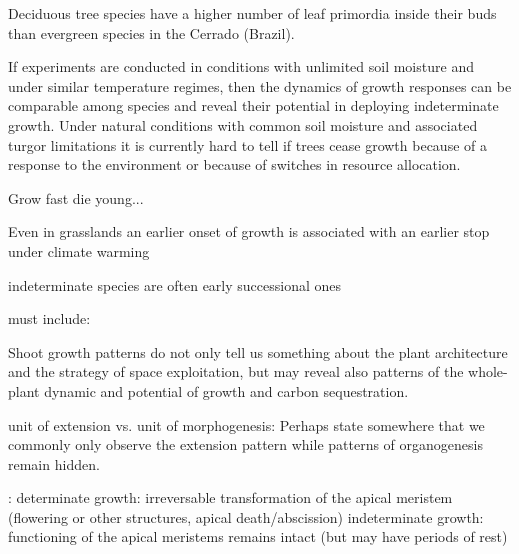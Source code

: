 \documentclass{article}
\begin{document}
Deciduous tree species have a higher number of leaf primordia inside their buds than evergreen species in the Cerrado (Brazil). 
	
If experiments are conducted in conditions with unlimited soil moisture and under similar temperature regimes, then the dynamics of growth responses can be comparable among species and reveal their potential in deploying indeterminate growth. Under natural conditions with common soil moisture and associated turgor limitations it is currently hard to tell if trees cease growth because of a response to the environment or because of switches in resource allocation. 

 Grow fast die young...
 
 Even in grasslands an earlier onset of growth is associated with an earlier stop under climate warming \cite{mohlGrowthAlpineGrassland2022a}
	
indeterminate species are often early successional ones \citep{marksRelationExtensionGrowth1975, boojhGrowthStrategyTrees1982}

	
	must include: 
	
	\cite{iwasaOptimalGrowthSchedule1989}
	
	
	
	Shoot growth patterns do not only tell us something about the plant architecture and the strategy of space exploitation, but may reveal also patterns of the whole-plant dynamic and potential of growth and carbon sequestration.
	
	unit of extension vs. unit of morphogenesis: Perhaps state somewhere that we commonly only observe the extension pattern while patterns of organogenesis remain hidden. 
	
	\cite{barthelemyPlantArchitectureDynamic2007}: determinate growth: irreversable transformation of the apical meristem (flowering or other structures, apical death/abscission)
	indeterminate growth: functioning of the apical meristems remains intact (but may have periods of rest)
	 
	
	\newpage
	
	
	
	
	
	
\end{document}
